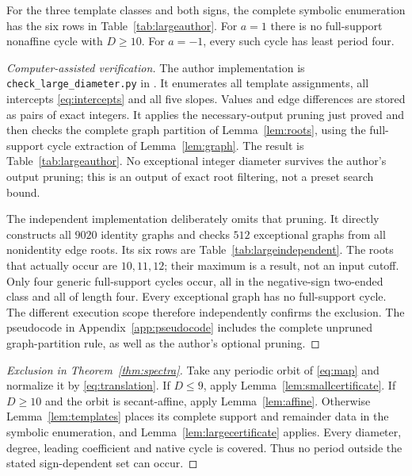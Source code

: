 \begin{lemma}\label{lem:largecertificate}
For the three template classes and both signs, the complete symbolic
enumeration has the six rows in Table~\ref{tab:largeauthor}.
For $a=1$ there is no full-support nonaffine cycle with $D\ge10$.
For $a=-1$, every such cycle has least period four.
\end{lemma}
\begin{proof}[Computer-assisted verification]
The author implementation is \texttt{check\_large\_diameter.py}
in \cite{IH6Working}. It enumerates all template assignments,
all intercepts \eqref{eq:intercepts} and all five slopes. Values
and edge differences are stored as pairs of exact integers.
It applies the necessary-output pruning just proved and then checks
the complete graph partition of Lemma~\ref{lem:roots}, using the
full-support cycle extraction of Lemma~\ref{lem:graph}. The result
is Table~\ref{tab:largeauthor}. No exceptional integer diameter
survives the author's output pruning; this is an output of exact
root filtering, not a preset search bound.

The independent implementation \cite{IH6Review} deliberately omits
that pruning. It directly constructs all $9020$ identity graphs
and checks $512$ exceptional graphs from all nonidentity edge
roots. Its six rows are Table~\ref{tab:largeindependent}. The roots
that actually occur are $10,11,12$; their maximum is a result,
not an input cutoff. Only four generic full-support cycles occur,
all in the negative-sign two-ended class and all of length four.
Every exceptional graph has no full-support cycle. The different
execution scope therefore independently confirms the exclusion.
The pseudocode in Appendix~\ref{app:pseudocode} includes the complete
unpruned graph-partition rule, as well as the author's optional
pruning.
\end{proof}




\begin{proof}[Exclusion in Theorem~\ref{thm:spectra}]
Take any periodic orbit of \eqref{eq:map} and normalize it by
\eqref{eq:translation}. If $D\le9$, apply
Lemma~\ref{lem:smallcertificate}. If $D\ge10$ and the orbit is
secant-affine, apply Lemma~\ref{lem:affine}. Otherwise
Lemma~\ref{lem:templates} places its complete support and remainder
data in the symbolic enumeration, and
Lemma~\ref{lem:largecertificate} applies. Every diameter, degree,
leading coefficient and native cycle is covered. Thus no period
outside the stated sign-dependent set can occur.
\end{proof}
